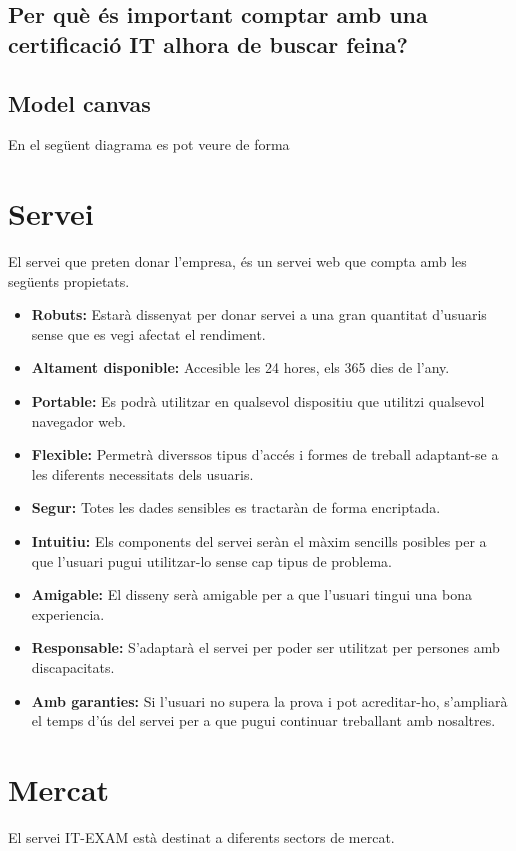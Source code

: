 \documentclass[12pt]{article}
\begin{document}
\subsection{Per què és important comptar amb una certificació IT alhora de buscar feina?}

\subsection{Model canvas}
En el següent diagrama es pot veure de forma 




\clearpage
\section{Servei}
El servei que preten donar l'empresa, és un servei web que compta amb les següents propietats.
\begin{itemize}
	\item \textbf{Robuts:} Estarà dissenyat per donar servei a una gran quantitat d'usuaris sense que es vegi afectat el rendiment.
	\item \textbf{Altament disponible:} Accesible les 24 hores, els 365 dies de l'any.
	\item \textbf{Portable:} Es podrà utilitzar en qualsevol dispositiu que utilitzi qualsevol navegador web.
	\item \textbf{Flexible:} Permetrà diverssos tipus d'accés i formes de treball adaptant-se a les diferents necessitats dels usuaris.
	\item \textbf{Segur:} Totes les dades sensibles es tractaràn de forma encriptada.
	\item \textbf{Intuitiu:} Els components del servei seràn el màxim sencills posibles per a que l'usuari pugui utilitzar-lo sense cap tipus de problema.
	\item \textbf{Amigable:} El disseny serà amigable per a que l'usuari tingui una bona experiencia.
	\item \textbf{Responsable:} S'adaptarà el servei per poder ser utilitzat per persones amb discapacitats.
	\item \textbf{Amb garanties:} Si l'usuari no supera la prova i pot acreditar-ho, s'ampliarà el temps d'ús del servei per a que pugui continuar treballant amb nosaltres.
\end{itemize} 




\clearpage
\section{Mercat}
El servei IT-EXAM està destinat a diferents sectors de mercat.
\end{document}
